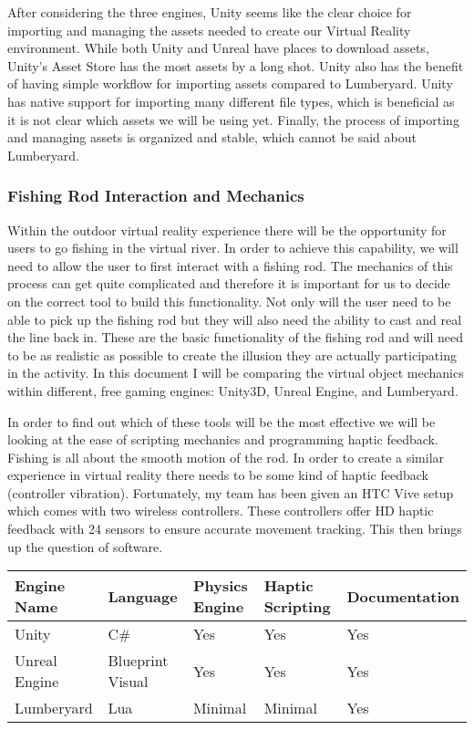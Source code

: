 \documentclass[10pt,journal,compsoc,onecolumn, draftclsnofoot]{IEEEtran}
\begin{document}
After considering the three engines, Unity seems like the clear choice for importing and managing the assets needed to create our Virtual Reality environment.
While both Unity and Unreal have places to download assets, Unity's Asset Store has the most assets by a long shot.
Unity also has the benefit of having simple workflow for importing assets compared to Lumberyard.
Unity has native support for importing many different file types, which is beneficial as it is not clear which assets we will be using yet.
Finally, the process of importing and managing assets is organized and stable, which cannot be said about Lumberyard.

\subsubsection{Fishing Rod Interaction and Mechanics}
Within the outdoor virtual reality experience there will be the opportunity for users to go fishing in the virtual river.
In order to achieve this capability, we will need to allow the user to first interact with a fishing rod.
The mechanics of this process can get quite complicated and therefore it is important for us to decide on the correct tool to build this functionality.
Not only will the user need to be able to pick up the fishing rod but they will also need the ability to cast and real the line back in.
These are the basic functionality of the fishing rod and will need to be as realistic as possible to create the illusion they are actually participating in the activity.
In this document I will be comparing the virtual object mechanics within different, free gaming engines: Unity3D, Unreal Engine, and Lumberyard.

In order to find out which of these tools will be the most effective we will be looking at the ease of scripting mechanics and programming haptic feedback.
Fishing is all about the smooth motion of the rod.
In order to create a similar experience in virtual reality there needs to be some kind of haptic feedback (controller vibration).
Fortunately, my team has been given an HTC Vive setup which comes with two wireless controllers.
These controllers offer HD haptic feedback with 24 sensors to ensure accurate movement tracking\cite{htc_corporation}.
This then brings up the question of software.

\vspace{2mm}
\begin{table}[h!]
\centering
  \begin{tabu} to 1.0\textwidth { | X[l] || X[c] | X[c] | X[c] | X[c] |  }
  \hline
  Engine Name & Language & Physics Engine & Haptic Scripting & Documentation\\
  \hline
  Unity  & C\# & Yes & Yes & Yes\\
  Unreal Engine &   Blueprint Visual  & Yes & Yes & Yes\\
  Lumberyard & Lua & Minimal & Minimal & Yes \\
  \hline
  \end{tabu}
\end{table}
\vspace{2mm}
\end{document}
